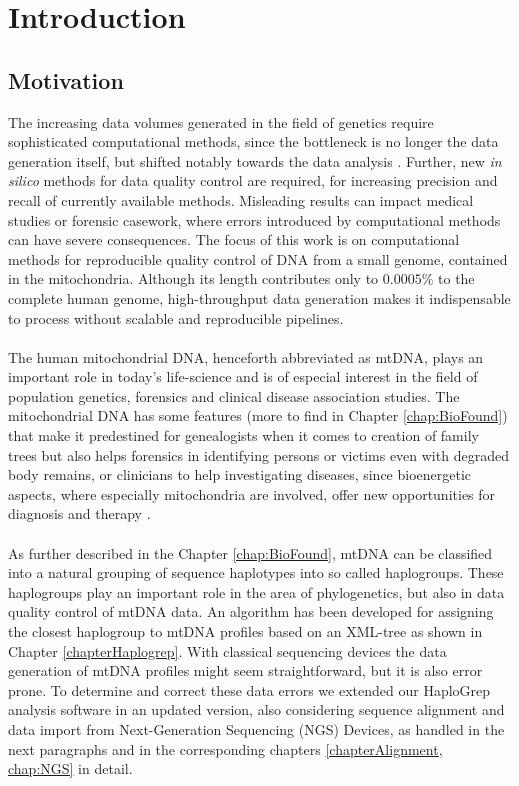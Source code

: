 \chapter{Introduction}
\label{chapterIntro}
\section{Motivation}
The increasing data volumes generated in the field of genetics require sophisticated computational methods, since the bottleneck is no longer the data generation itself, but shifted notably towards the data analysis \cite{Forer2016}. Further, new \textit{in silico} methods for data quality control are required, for increasing precision and recall of currently available methods. Misleading results can impact medical studies or forensic casework, where errors introduced by computational methods can have severe consequences. The focus of this work is on computational methods for reproducible quality control of DNA from a small genome, contained in the mitochondria. Although its length contributes only to $0.0005\%$ to the complete human genome, high-throughput data generation makes it indispensable to process without scalable and reproducible pipelines. 
\\
\\
The human mitochondrial DNA, henceforth abbreviated as mtDNA, plays an important role in today's life-science and is of especial interest in the field of population genetics, forensics and clinical disease association studies. The mitochondrial DNA has some features (more to find in Chapter \ref{chap:BioFound}) that make it predestined for genealogists when it comes to creation of family trees but also helps forensics in identifying persons or victims even with degraded body remains, or clinicians to help investigating diseases, since bioenergetic aspects, where especially mitochondria are involved, offer new opportunities for diagnosis and therapy \cite{Picard2016}.
\\
\\
As further described in the Chapter \ref{chap:BioFound}, mtDNA can be classified into a natural grouping of sequence haplotypes into so called haplogroups. These haplogroups play an important role in the area of phylogenetics, but also in data quality control of mtDNA data. An algorithm has been developed for assigning the closest haplogroup to mtDNA profiles based on an XML-tree as shown in Chapter \ref{chapterHaplogrep}. With classical sequencing devices the data generation of mtDNA profiles might seem straightforward, but it is also error prone. To determine and correct these data errors we extended our HaploGrep analysis software in an updated version, also considering sequence alignment and data import from Next-Generation Sequencing (NGS) Devices, as handled in the next paragraphs and in the corresponding chapters \ref{chapterAlignment, chap:NGS} in detail.
